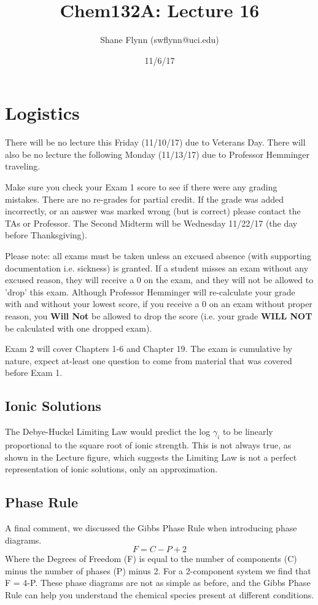 \documentclass{article}
\title{Chem132A: Lecture 16}
\author{Shane Flynn (swflynn@uci.edu)}
\date{11/6/17}
\newcommand{\be}{\begin{equation}}
\newcommand{\ee}{\end{equation}}
\begin{document}
\maketitle

\section*{Logistics}
There will be no lecture this Friday (11/10/17) due to Veterans Day. 
There will also be no lecture the following Monday (11/13/17) due to Professor Hemminger traveling. 

Make sure you check your Exam 1 score to see if there were any grading mistakes.
There are no re-grades for partial credit.
If the grade was added incorrectly, or an answer was marked wrong (but is correct) please contact the TAs or Professor. 
The Second Midterm will be Wednesday 11/22/17 (the day before Thanksgiving). 

Please note: all exams must be taken unless an excused absence (with supporting documentation i.e. sickness) is granted.
If a student misses an exam without any excused reason, they will receive a 0 on the exam, and they will not be allowed to 'drop' this exam.
Although Professor Hemminger will re-calculate your grade with and without your lowest score, if you receive a 0 on an exam without proper reason, you \textbf{Will Not} be allowed to drop the score (i.e. your grade \textbf{WILL NOT} be calculated with one dropped exam). 

Exam 2 will cover Chapters 1-6 and Chapter 19. 
The exam is cumulative by nature, expect at-least one question to come from material that was covered  before Exam 1.

\subsection*{Ionic Solutions}
The Debye-Huckel Limiting Law would predict the log  $\gamma_i$ to be linearly proportional to the square root of ionic  strength.
This is not always true, as shown in the Lecture figure, which suggests the Limiting Law is not a perfect representation of ionic solutions, only an approximation. 

\subsection*{Phase Rule}
A final comment, we discussed the Gibbs Phase Rule  when introducing phase diagrams.
\be
F = C - P + 2
\ee
Where the Degrees of Freedom (F) is equal to the number of components (C) minus the number of phases (P) minus 2. 
For a 2-component system we find that F = 4-P.
These phase diagrams are not as simple as before, and the Gibbs Phase Rule can help you understand the chemical species present at different conditions. 
\end{document}
